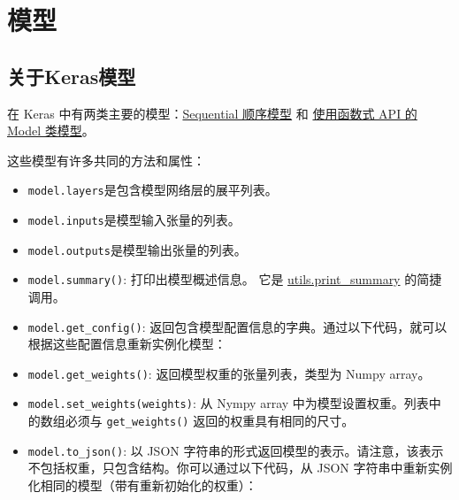 \section{模型}\label{about-keras-models}
\subsection{关于Keras模型}
在 Keras 中有两类主要的模型：\hyperref[sequential-api]{Sequential 顺序模型} 和 \hyperref[model-api]{使用函数式 API 的 Model 类模型}。

这些模型有许多共同的方法和属性：

\begin{itemize}
\tightlist
\item \texttt{model.layers}是包含模型网络层的展平列表。
\item \texttt{model.inputs}是模型输入张量的列表。
\item \texttt{model.outputs}是模型输出张量的列表。
\item
  \texttt{model.summary()}: 打印出模型概述信息。 它是
  \hyperref[print-summary]{utils.print\_summary} 的简捷调用。
\item
  \texttt{model.get\_config()}:
  返回包含模型配置信息的字典。通过以下代码，就可以根据这些配置信息重新实例化模型：
\end{itemize}

\begin{Shaded}
\begin{Highlighting}[]
\OperatorTok{=} 
\OperatorTok{=} 
\OperatorTok{=} 
\end{Highlighting}
\end{Shaded}

\begin{itemize}
\tightlist
\item
  \texttt{model.get\_weights()}: 返回模型权重的张量列表，类型为 Numpy
  array。
\item
  \texttt{model.set\_weights(weights)}: 从 Nympy array
  中为模型设置权重。列表中的数组必须与 \texttt{get\_weights()}
  返回的权重具有相同的尺寸。
\item
  \texttt{model.to\_json()}: 以 JSON
  字符串的形式返回模型的表示。请注意，该表示不包括权重，只包含结构。你可以通过以下代码，从
  JSON 字符串中重新实例化相同的模型（带有重新初始化的权重）：
\end{itemize}

